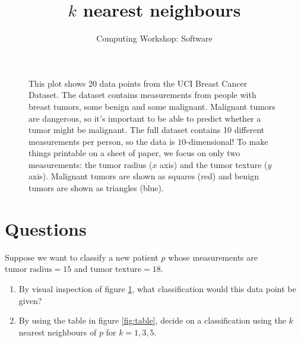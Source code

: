 \documentclass[11pt]{article}
\title{$k$ nearest neighbours}
\author{Computing Workshop: Software}
\begin{document}
\maketitle

\begin{figure}[h]
  \centering
  \caption{%
    This plot shows 20 data points from the UCI Breast Cancer Dataset.
    The dataset contains measurements from people with breast tumors, some
    benign and some malignant. Malignant tumors are dangerous, so it's important
    to be able to predict whether a tumor might be malignant.
    The full dataset contains 10 different measurements per person, so the data
    is $10$-dimensional! To make things printable on a sheet of paper, we focus
    on only two measurements: the tumor radius ($x$ axis) and the tumor texture
    ($y$ axis).%
    Malignant tumors are shown as squares (red) and benign tumors are shown as
    triangles (blue).
  }
  \label{fig:chart}
\end{figure}

\section*{Questions}

Suppose we want to classify a new patient $p$ whose measurements are
$\text{tumor radius} = 15$ and $\text{tumor texture} = 18$.

\begin{enumerate}
\item
  By visual inspection of figure \ref{fig:chart}, what classification would this
  data point be given?
  \vspace{2em}
\item
  By using the table in figure \ref{fig:table}, decide on a classification using
  the $k$ nearest neighbours of $p$ for $k=1,3,5$.
  \vspace{2em}
\end{enumerate}
\end{document}
